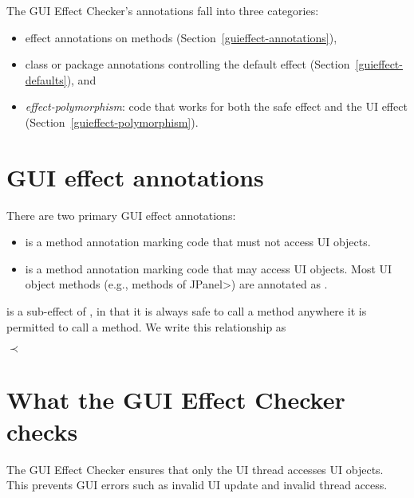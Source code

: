 
The GUI Effect Checker's annotations fall into three categories:

\begin{itemize}
\item
  effect annotations on methods (Section~\ref{guieffect-annotations}),
\item
 class or package annotations controlling the default effect (Section~\ref{guieffect-defaults}), and
\item
  \emph{effect-polymorphism}:  code that works for both the safe effect and
  the UI effect (Section~\ref{guieffect-polymorphism}).
\end{itemize}


\section{GUI effect annotations\label{guieffect-annotations}}


There are two primary GUI effect annotations:
\begin{itemize}
\item
  is a method annotation marking code that must not
  access UI objects.
\item
  is a method annotation marking code that may access
  UI objects.  Most UI object methods (e.g., methods of \<JPanel>) are
  annotated as .
\end{itemize}

 is a sub-effect of , in that it is always safe to
call a  method anywhere it is permitted to call a
 method.  We write this relationship as

\centerline{ $\prec$ }



\section{What the GUI Effect Checker checks\label{guieffect-checks}}

The GUI Effect Checker ensures that only the UI thread accesses UI objects.
This prevents GUI errors such
as invalid UI update and invalid thread access.

